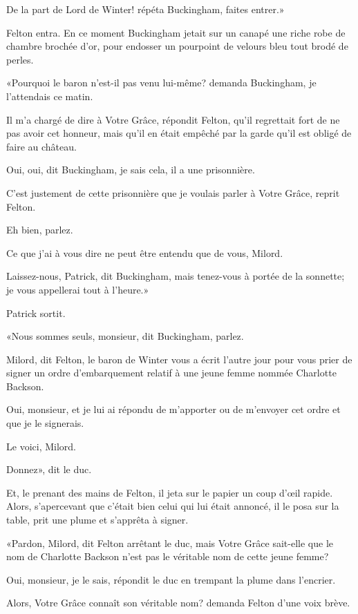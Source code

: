 \speak  De la part de Lord de Winter! répéta Buckingham, faites entrer.» 

Felton entra. En ce moment Buckingham jetait sur un canapé une riche robe de chambre brochée d'or, pour endosser un pourpoint de velours bleu tout brodé de perles. 

«Pourquoi le baron n'est-il pas venu lui-même? demanda Buckingham, je l'attendais ce matin. 

\speak  Il m'a chargé de dire à Votre Grâce, répondit Felton, qu'il regrettait fort de ne pas avoir cet honneur, mais qu'il en était empêché par la garde qu'il est obligé de faire au château. 

\speak  Oui, oui, dit Buckingham, je sais cela, il a une prisonnière. 

\speak  C'est justement de cette prisonnière que je voulais parler à Votre Grâce, reprit Felton. 

\speak  Eh bien, parlez. 

\speak  Ce que j'ai à vous dire ne peut être entendu que de vous, Milord. 

\speak  Laissez-nous, Patrick, dit Buckingham, mais tenez-vous à portée de la sonnette; je vous appellerai tout à l'heure.» 

Patrick sortit. 

«Nous sommes seuls, monsieur, dit Buckingham, parlez. 

\speak  Milord, dit Felton, le baron de Winter vous a écrit l'autre jour pour vous prier de signer un ordre d'embarquement relatif à une jeune femme nommée Charlotte Backson. 

\speak  Oui, monsieur, et je lui ai répondu de m'apporter ou de m'envoyer cet ordre et que je le signerais. 

\speak  Le voici, Milord. 

\speak  Donnez», dit le duc. 

Et, le prenant des mains de Felton, il jeta sur le papier un coup d'œil rapide. Alors, s'apercevant que c'était bien celui qui lui était annoncé, il le posa sur la table, prit une plume et s'apprêta à signer. 

«Pardon, Milord, dit Felton arrêtant le duc, mais Votre Grâce sait-elle que le nom de Charlotte Backson n'est pas le véritable nom de cette jeune femme? 

\speak  Oui, monsieur, je le sais, répondit le duc en trempant la plume dans l'encrier. 

\speak  Alors, Votre Grâce connaît son véritable nom? demanda Felton d'une voix brève. 

